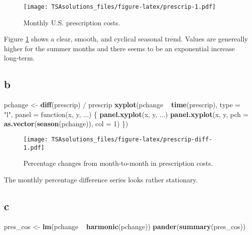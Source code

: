 \documentclass[]{book}
\newenvironment{Shaded}{\begin{snugshade}}{\end{snugshade}}
\newcommand{\KeywordTok}[1]{\textcolor[rgb]{0.13,0.29,0.53}{\textbf{{#1}}}}
\newcommand{\DataTypeTok}[1]{\textcolor[rgb]{0.13,0.29,0.53}{{#1}}}
\newcommand{\DecValTok}[1]{\textcolor[rgb]{0.00,0.00,0.81}{{#1}}}
\newcommand{\StringTok}[1]{\textcolor[rgb]{0.31,0.60,0.02}{{#1}}}
\newcommand{\NormalTok}[1]{{#1}}
\theoremstyle{definition}
\theoremstyle{definition}
\theoremstyle{remark}
\begin{document}
\begin{figure}[htbp]
\centering
\texttt{[image: TSAsolutions\_files/figure-latex/prescrip-1.pdf]}
\caption{\label{fig:prescrip}Monthly U.S. prescription costs.}
\end{figure}

Figure \ref{fig:prescrip} shows a clear, smooth, and cyclical seasonal
trend. Values are genereally higher for the summer months and there
seems to be an exponential increase long-term.

\subsection*{b}\label{b-26}

\begin{Shaded}
\begin{Highlighting}[]
\NormalTok{pchange <-}\StringTok{ }\KeywordTok{diff}\NormalTok{(prescrip) /}\StringTok{ }\NormalTok{prescrip}
\KeywordTok{xyplot}\NormalTok{(pchange ~}\StringTok{ }\KeywordTok{time}\NormalTok{(prescrip), }\DataTypeTok{type =} \StringTok{"l"}\NormalTok{,}
       \DataTypeTok{panel =} \NormalTok{function(x, y, ...) \{}
         \KeywordTok{panel.xyplot}\NormalTok{(x, y, ...)}
         \KeywordTok{panel.xyplot}\NormalTok{(x, y, }\DataTypeTok{pch =} \KeywordTok{as.vector}\NormalTok{(}\KeywordTok{season}\NormalTok{(pchange)), }\DataTypeTok{col =} \DecValTok{1}\NormalTok{)}
       \NormalTok{\})}
\end{Highlighting}
\end{Shaded}

\begin{figure}[htbp]
\centering
\texttt{[image: TSAsolutions\_files/figure-latex/prescrip-diff-1.pdf]}
\caption{\label{fig:prescrip-diff}Percentage changes from month-to-month in
prescription costs.}
\end{figure}

The monthly percentage difference series looks rather stationary.

\subsection*{c}\label{c-15}

\begin{Shaded}
\begin{Highlighting}[]
\NormalTok{pres_cos <-}\StringTok{ }\KeywordTok{lm}\NormalTok{(pchange ~}\StringTok{ }\KeywordTok{harmonic}\NormalTok{(pchange))}
\KeywordTok{pander}\NormalTok{(}\KeywordTok{summary}\NormalTok{(pres_cos))}
\end{Highlighting}
\end{Shaded}
\end{document}
